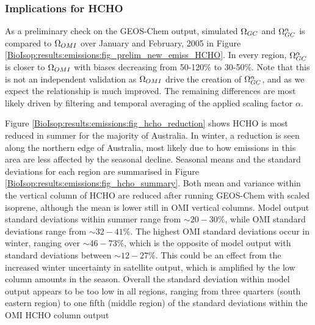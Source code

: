     
    \subsubsection{Implications for HCHO}
  
      As a preliminary check on the GEOS-Chem output, simulated $\Omega_{GC}$ and $\Omega_{GC}^{\alpha}$ is compared to $\Omega_{OMI}$ over January and February, 2005 in Figure \ref{BioIsop:results:emissions:fig_prelim_new_emiss_HCHO}.
      In every region, $\Omega_{GC}^{\alpha}$ is closer to $\Omega_{OMI}$ with biases decreasing from 50-120\% to 30-50\%.
      Note that this is not an independent validation as $\Omega_{OMI}$ drive the creation of $\Omega_{GC}^{\alpha}$, and as we expect the relationship is much improved.
      The remaining differences are most likely driven by filtering and temporal averaging of the applied scaling factor $\alpha$.
      
      
      
      Figure \ref{BioIsop:results:emissions:fig_hcho_reduction} shows HCHO is most reduced in summer for the majority of Australia.
      In winter, a reduction is seen along the northern edge of Australia, most likely due to how emissions in this area are less affected by the seasonal decline.
      Seasonal means and the standard deviations for each region are summarised in Figure \ref{BioIsop:results:emissions:fig_hcho_summary}.
      Both mean and variance within the vertical column of HCHO are reduced after running GEOS-Chem with scaled isoprene, although the mean is lower still in OMI vertical columns.
      Model output standard deviations within summer range from $\sim{20-30}\%$, while OMI standard deviations range from $\sim{32-41}\%$.
      The highest OMI standard deviations occur in winter, ranging over $\sim{46-73}\%$, which is the opposite of model output with standard deviations between $\sim{12-27}\%$.
      This could be an effect from the increased winter uncertainty in satellite output, which is amplified by the low column amounts in the season.
      Overall the standard deviation within model output appears to be too low in all regions, ranging from three quarters (south eastern region) to one fifth (middle region) of the standard deviations within the OMI HCHO column output
      
